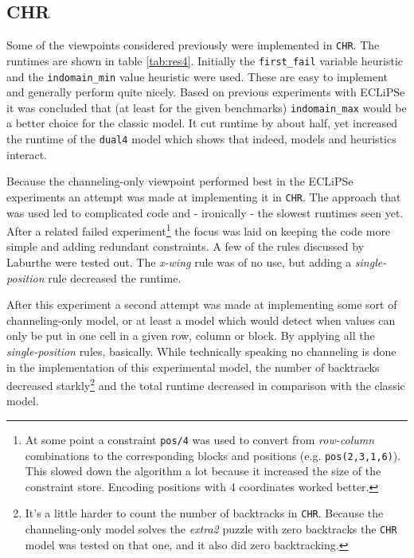 \subsection{CHR}

Some of the viewpoints considered previously were implemented in \texttt{CHR}. The runtimes are shown in table \ref{tab:res4}. Initially the \texttt{first\_fail} variable heuristic and the \texttt{indomain\_min} value heuristic were used. These are easy to implement and generally perform quite nicely. Based on previous experiments with ECLiPSe it was concluded that (at least for the given benchmarks) \texttt{indomain\_max} would be a better choice for the classic model. It cut runtime by about half, yet increased the runtime of the \texttt{dual4} model which shows that indeed, models and heuristics interact.\\\par 

Because the channeling-only viewpoint performed best in the ECLiPSe experiments an attempt was made at implementing it in \texttt{CHR}. The approach that was used led to complicated code and - ironically - the slowest runtimes seen yet. After a related failed experiment\footnote{At some point a constraint \texttt{pos/4} was used to convert from \textit{row-column} combinations to the corresponding blocks and positions (e.g. \texttt{pos(2,3,1,6)}). This slowed down the algorithm a lot because it increased the size of the constraint store. Encoding positions with 4 coordinates worked better.} the focus was laid on keeping the code more simple and adding redundant constraints. A few of the rules discussed by Laburthe \cite{article:laburthe} were tested out. The \textit{x-wing} rule was of no use, but adding a \textit{single-position} rule decreased the runtime. \\\par

After this experiment a second attempt was made at implementing some sort of channeling-only model, or at least a model which would detect when values can only be put in one cell in a given row, column or block. By applying all the \textit{single-position} rules, basically. While technically speaking no channeling is done in the implementation of this experimental model, the number of backtracks decreased starkly\footnote{It's a little harder to count the number of backtracks in \texttt{CHR}. Because the channeling-only model solves the \textit{extra2} puzzle with zero backtracks the \texttt{CHR} model was tested on that one, and it also did zero backtracking.} and the total runtime decreased in comparison with the classic model.\\\par

